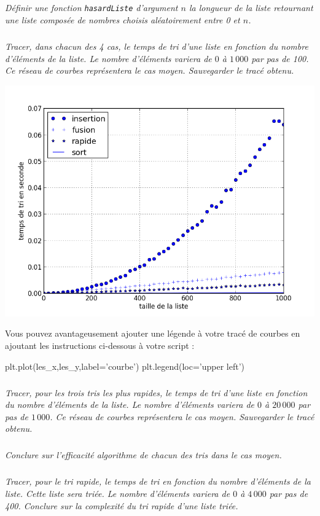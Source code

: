\documentclass[10pt,fleqn]{article} %
\begin{document}
\begin{multicols}{2}
\subparagraph{}
\textit{Définir une fonction \texttt{hasardListe} d'argument $n$ la longueur de la liste retournant une liste composée de nombres choisis aléatoirement entre 0 et $n$.}

\subparagraph{}
\textit{Tracer, dans chacun des 4 cas, le temps de tri d'une liste en fonction du nombre d'éléments de la liste. Le nombre d'éléments variera de $0$ à $1\, 000$ par pas de 100. Ce réseau de courbes représentera le cas moyen. Sauvegarder le tracé obtenu.}

\begin{center}
\includegraphics[width=.8\linewidth]{images/trace1}
\end{center}

Vous pouvez avantageusement ajouter une légende à votre tracé de courbes en ajoutant les instructions ci-dessous à votre script :
\begin{python}
plt.plot(les_x,les_y,label='courbe')
plt.legend(loc='upper left')
\end{python}

\subparagraph{}
\textit{Tracer, pour les trois tris les plus rapides, le temps de tri d'une liste en fonction du nombre d'éléments de la liste. Le nombre d'éléments variera de $0$ à $20\, 000$ par pas de $1\,000$. Ce réseau de courbes représentera le cas moyen. Sauvegarder le tracé obtenu.}

\subparagraph{}
\textit{Conclure sur l'efficacité algorithme de chacun des tris dans le cas moyen.}

\subparagraph{}
\textit{Tracer, pour le tri rapide, le temps de tri en fonction du nombre d'éléments de la liste. Cette liste sera triée. Le nombre d'éléments variera de $0$ à $4\,000$ par pas de 400. Conclure sur la complexité du tri rapide d'une liste triée.}


\end{multicols}
\end{document}
